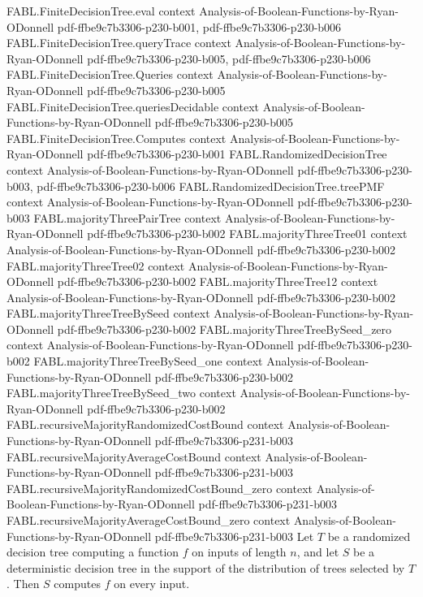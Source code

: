 \begin{theorem}
\proofstep
  {FABL.FiniteDecisionTree.eval}
  {context}
  {Analysis-of-Boolean-Functions-by-Ryan-ODonnell}
  {pdf-ffbe9c7b3306-p230-b001,
    pdf-ffbe9c7b3306-p230-b006}
\proofstep
  {FABL.FiniteDecisionTree.queryTrace}
  {context}
  {Analysis-of-Boolean-Functions-by-Ryan-ODonnell}
  {pdf-ffbe9c7b3306-p230-b005,
    pdf-ffbe9c7b3306-p230-b006}
\proofstep
  {FABL.FiniteDecisionTree.Queries}
  {context}
  {Analysis-of-Boolean-Functions-by-Ryan-ODonnell}
  {pdf-ffbe9c7b3306-p230-b005}
\proofstep
  {FABL.FiniteDecisionTree.queriesDecidable}
  {context}
  {Analysis-of-Boolean-Functions-by-Ryan-ODonnell}
  {pdf-ffbe9c7b3306-p230-b005}
\proofstep
  {FABL.FiniteDecisionTree.Computes}
  {context}
  {Analysis-of-Boolean-Functions-by-Ryan-ODonnell}
  {pdf-ffbe9c7b3306-p230-b001}
\proofstep
  {FABL.RandomizedDecisionTree}
  {context}
  {Analysis-of-Boolean-Functions-by-Ryan-ODonnell}
  {pdf-ffbe9c7b3306-p230-b003,
    pdf-ffbe9c7b3306-p230-b006}
\proofstep
  {FABL.RandomizedDecisionTree.treePMF}
  {context}
  {Analysis-of-Boolean-Functions-by-Ryan-ODonnell}
  {pdf-ffbe9c7b3306-p230-b003}
\proofstep
  {FABL.majorityThreePairTree}
  {context}
  {Analysis-of-Boolean-Functions-by-Ryan-ODonnell}
  {pdf-ffbe9c7b3306-p230-b002}
\proofstep
  {FABL.majorityThreeTree01}
  {context}
  {Analysis-of-Boolean-Functions-by-Ryan-ODonnell}
  {pdf-ffbe9c7b3306-p230-b002}
\proofstep
  {FABL.majorityThreeTree02}
  {context}
  {Analysis-of-Boolean-Functions-by-Ryan-ODonnell}
  {pdf-ffbe9c7b3306-p230-b002}
\proofstep
  {FABL.majorityThreeTree12}
  {context}
  {Analysis-of-Boolean-Functions-by-Ryan-ODonnell}
  {pdf-ffbe9c7b3306-p230-b002}
\proofstep
  {FABL.majorityThreeTreeBySeed}
  {context}
  {Analysis-of-Boolean-Functions-by-Ryan-ODonnell}
  {pdf-ffbe9c7b3306-p230-b002}
\proofstep
  {FABL.majorityThreeTreeBySeed_zero}
  {context}
  {Analysis-of-Boolean-Functions-by-Ryan-ODonnell}
  {pdf-ffbe9c7b3306-p230-b002}
\proofstep
  {FABL.majorityThreeTreeBySeed_one}
  {context}
  {Analysis-of-Boolean-Functions-by-Ryan-ODonnell}
  {pdf-ffbe9c7b3306-p230-b002}
\proofstep
  {FABL.majorityThreeTreeBySeed_two}
  {context}
  {Analysis-of-Boolean-Functions-by-Ryan-ODonnell}
  {pdf-ffbe9c7b3306-p230-b002}
\proofstep
  {FABL.recursiveMajorityRandomizedCostBound}
  {context}
  {Analysis-of-Boolean-Functions-by-Ryan-ODonnell}
  {pdf-ffbe9c7b3306-p231-b003}
\proofstep
  {FABL.recursiveMajorityAverageCostBound}
  {context}
  {Analysis-of-Boolean-Functions-by-Ryan-ODonnell}
  {pdf-ffbe9c7b3306-p231-b003}
\proofstep
  {FABL.recursiveMajorityRandomizedCostBound_zero}
  {context}
  {Analysis-of-Boolean-Functions-by-Ryan-ODonnell}
  {pdf-ffbe9c7b3306-p231-b003}
\proofstep
  {FABL.recursiveMajorityAverageCostBound_zero}
  {context}
  {Analysis-of-Boolean-Functions-by-Ryan-ODonnell}
  {pdf-ffbe9c7b3306-p231-b003}
Let $T$ be a randomized decision tree computing a function $f$ on inputs of length $n$,
and let $S$ be a deterministic decision tree in the support of the distribution of trees
selected by $T$. Then $S$ computes $f$ on every input.
\end{theorem}


